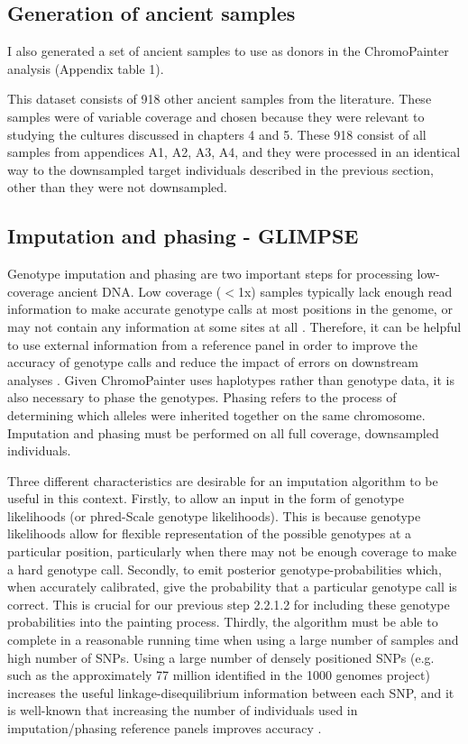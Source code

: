 \subsection{Generation of ancient samples} \label{AncientReferenceSamples}

I also generated a set of ancient samples to use as donors in the ChromoPainter analysis (Appendix table 1).

This dataset consists of 918 other ancient samples from the literature. These samples were of variable coverage and chosen because they were relevant to studying the cultures discussed in chapters 4 and 5. These 918 consist of all samples from appendices A1, A2, A3, A4, and they were processed in an identical way to the downsampled target individuals described in the previous section, other than they were not downsampled.  

\subsection{Imputation and phasing - GLIMPSE}

Genotype imputation and phasing are two important steps for processing low-coverage ancient DNA. Low coverage ($<$1x) samples typically lack enough read information to make accurate genotype calls at most positions in the genome, or may not contain any information at some sites at all \cite{nielsen2011genotype}. Therefore, it can be helpful to use external information from a reference panel in order to improve the accuracy of genotype calls and reduce the impact of errors on downstream analyses \cite{rubinacci2021efficient}. Given ChromoPainter uses haplotypes rather than genotype data, it is also necessary to phase the genotypes. Phasing refers to the process of determining which alleles were inherited together on the same chromosome. Imputation and phasing must be performed on all full coverage, downsampled individuals. 

Three different characteristics are desirable for an imputation algorithm to be useful in this context. Firstly, to allow an input in the form of genotype likelihoods (or phred-Scale genotype likelihoods). This is because genotype likelihoods allow for flexible representation of the possible genotypes at a particular position, particularly when there may not be enough coverage to make a hard genotype call. Secondly, to emit posterior genotype-probabilities which, when accurately calibrated, give the probability that a particular genotype call is correct. This is crucial for our previous step 2.2.1.2 for including these genotype probabilities into the painting process. Thirdly, the algorithm must be able to complete in a reasonable running time when using a large number of samples and high number of SNPs. Using a large number of densely positioned SNPs (e.g. such as the approximately 77 million identified in the 1000 genomes project) increases the useful linkage-disequilibrium information between each SNP, and it is well-known that increasing the number of individuals used in imputation/phasing reference panels improves accuracy \cite{delaneau2018integrative, HUANG2009235, mccarthy2016reference, rubinacci2021efficient}. 

